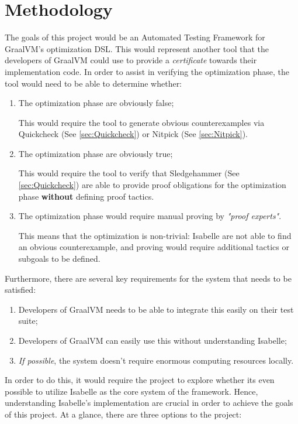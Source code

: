 \section{Methodology}

The goals of this project would be an Automated Testing Framework for GraalVM's optimization DSL. This would represent another tool that the 
developers of GraalVM could use to provide a \emph{certificate} towards their implementation code. In order to assist in verifying the optimization 
phase, the tool would need to be able to determine whether:

\begin{enumerate}
    \item The optimization phase are obviously false;
    
          This would require the tool to generate obvious counterexamples via Quickcheck (See \ref{sec:Quickcheck}) or Nitpick (See \ref{sec:Nitpick}).

    \item The optimization phase are obviously true;
    
          This would require the tool to verify that Sledgehammer (See \ref{sec:Quickcheck}) are able to provide proof obligations for the 
          optimization phase \textbf{without} defining proof tactics.

    \item The optimization phase would require manual proving by \emph{"proof experts"}.
          
          This means that the optimization is non-trivial: Isabelle are not able to find an obvious counterexample, and proving would require 
          additional tactics or subgoals to be defined.

\end{enumerate}

Furthermore, there are several key requirements for the system that needs to be satisfied:

\begin{enumerate}
      \item Developers of GraalVM needs to be able to integrate this easily on their test suite;
      \item Developers of GraalVM can easily use this without understanding Isabelle;
      \item \emph{If possible}, the system doesn't require enormous computing resources locally.
\end{enumerate}

In order to do this, it would require the project to explore whether its even possible to utilize Isabelle as the core system of the framework. 
Hence, understanding Isabelle's implementation are crucial in order to achieve the goals of this project. At a glance, there are three options 
to the project:

